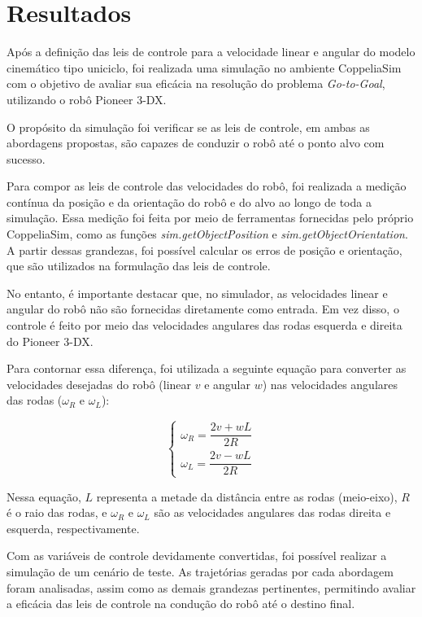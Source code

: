 \documentclass[conference]{IEEEtran}
\begin{document}
\section{Resultados}

Após a definição das leis de controle para a velocidade linear e angular do modelo cinemático tipo uniciclo, foi realizada uma simulação no ambiente CoppeliaSim com o objetivo de avaliar sua eficácia na resolução do problema \textit{Go-to-Goal}, utilizando o robô Pioneer 3-DX.

O propósito da simulação foi verificar se as leis de controle, em ambas as abordagens propostas, são capazes de conduzir o robô até o ponto alvo com sucesso.

Para compor as leis de controle das velocidades do robô, foi realizada a medição contínua da posição e da orientação do robô e do alvo ao longo de toda a simulação. Essa medição foi feita por meio de ferramentas fornecidas pelo próprio CoppeliaSim, como as funções \textit{sim.getObjectPosition} e \textit{sim.getObjectOrientation}. A partir dessas grandezas, foi possível calcular os erros de posição e orientação, que são utilizados na formulação das leis de controle.

No entanto, é importante destacar que, no simulador, as velocidades linear e angular do robô não são fornecidas diretamente como entrada. Em vez disso, o controle é feito por meio das velocidades angulares das rodas esquerda e direita do Pioneer 3-DX.

Para contornar essa diferença, foi utilizada a seguinte equação para converter as velocidades desejadas do robô (linear $v$ e angular $w$) nas velocidades angulares das rodas ($\omega_R$ e $\omega_L$):

\begin{equation}
    \begin{cases}
        \omega_R = \dfrac{2v + wL}{2R} \\
        \omega_L = \dfrac{2v - wL}{2R}
    \end{cases}
\end{equation}

Nessa equação, $L$ representa a metade da distância entre as rodas (meio-eixo), $R$ é o raio das rodas, e $\omega_R$ e $\omega_L$ são as velocidades angulares das rodas direita e esquerda, respectivamente.

Com as variáveis de controle devidamente convertidas, foi possível realizar a simulação de um cenário de teste. As trajetórias geradas por cada abordagem foram analisadas, assim como as demais grandezas pertinentes, permitindo avaliar a eficácia das leis de controle na condução do robô até o destino final.
\end{document}
